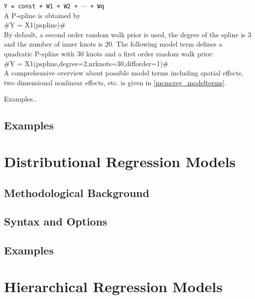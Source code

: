 \texttt{Y = const + W1 + W2 + $\cdots$ + Wq} \\

A P-spline is obtained by \\

#Y = X1(pspline)# \\

By default, a second order random walk prior is used, the degree of the spline is 3 and the number of inner
knots is 20. The following model term defines a quadratic P-spline
with 30 knots and a first order random walk prior: \\

#Y = X1(pspline,degree=2,nrknots=30,difforder=1)# \\



A comprehensive overview about  possible model terms including
spatial effects, two dimensional nonlinear effects, etc. is given in \autoref{mcmcreg_modelterms}.


Examples..











\subsection{Examples}

\section{Distributional Regression Models}

\subsection{Methodological Background}

\subsection{Syntax and Options}

\subsection{Examples}

\section{Hierarchical Regression Models}

